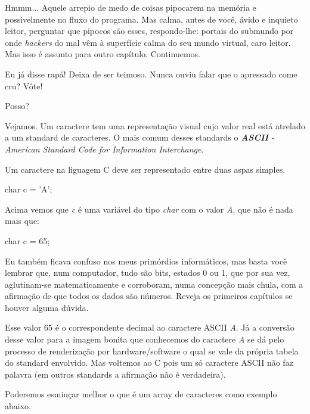 
Hmmm... Aquele arrepio de medo de coisas pipocarem na memória e possivelmente
no fluxo do programa. Mas calma, antes de você, ávido e inquieto leitor,
perguntar que pipocos são esses, respondo-lhe: portais do submundo por onde
\textit{hackers} do mal vêm à superfície calma do seu mundo virtual, caro
leitor. Mas isso é assunto para outro capítulo. Continuemos.


Eu já disse rapá! Deixa de ser teimoso. Nunca ouviu falar que o apressado come
cru? Vôte!

Posso?


Vejamos. Um caractere tem uma representação visual cujo valor real está
atrelado a um standard de caracteres. O mais comum desses standards o
\textit{\textbf{ASCII} - American Standard Code for Information Interchange}.

Um caractere na liguagem C deve ser representado entre duas aspas simples.

\begin{ccode}
  char c = 'A';
\end{ccode}

Acima vemos que \textit{c} é uma variável do tipo \textit{char} com o valor
\textit{A}, que não é nada mais que:

\begin{ccode}
  char c = 65;
\end{ccode}


Eu também ficava confuso nos meus primórdios informáticos, mas basta você
lembrar que, num computador, tudo são bits, estados 0 ou 1, que por sua vez,
aglutinam-se matematicamente e corroboram, numa concepção mais chula, com a
afirmação de que todos os dados são números. Reveja os primeiros capítulos se
houver alguma dúvida.


Esse valor 65 é o correspondente decimal ao caractere ASCII \textit{A}. Já a
conversão desse valor para a imagem bonita que conhecemos do caractere
\textit{A} se dá pelo processo de renderização por hardware/software o qual se
vale da própria tabela do standard envolvido. Mas voltemos ao C pois um só
caractere ASCII não faz palavra (em outros standards a afirmação não é
verdadeira).

Poderemos esmiuçar melhor o que é um array de caracteres como exemplo abaixo.

